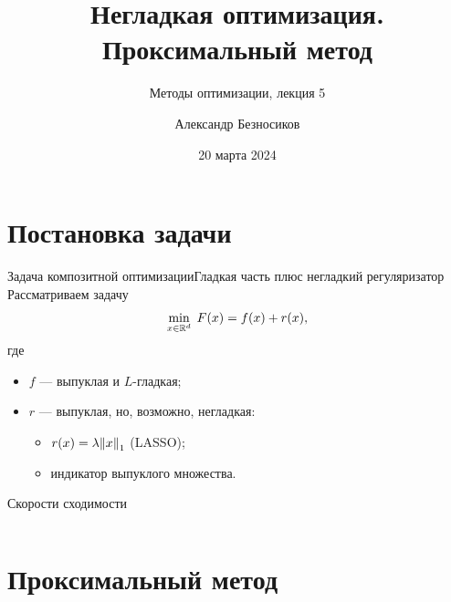 \documentclass[aspectratio=169,12pt]{beamer}
\title[Проксимальный метод]{Негладкая оптимизация. Проксимальный метод}
\subtitle{Методы оптимизации, лекция 5}
\author{Александр Безносиков}
\institute{BRAIn lab, МФТИ}
\date{20 марта 2024}
\begin{document}
\titleframe

\begin{frame}{\contentsname}
  \tableofcontents
\end{frame}

\section{Постановка задачи}   %

\begin{frame}{Задача композитной оптимизации}{Гладкая часть плюс негладкий регуляризатор}
  Рассматриваем задачу
  \[
    \min_{x \in \mathbb{R}^{d}} \; F(x) = f(x) + r(x),
  \]
  где
  \begin{itemize}
    \item $f$ --- выпуклая и $L$-гладкая;
    \item $r$ --- выпуклая, но, возможно, \alert{негладкая}:
      \begin{itemize}
        \item $r(x) = \lambda \norm{x}_1$ (LASSO);
        \item индикатор выпуклого множества.
      \end{itemize}
  \end{itemize}
\end{frame}

\begin{frame}{Скорости сходимости}
  \begin{columns}[T,onlytextwidth]
  \end{columns}
\end{frame}

\begin{frame}[c,dark]
\end{frame}

\section{Проксимальный метод}
\end{document}
